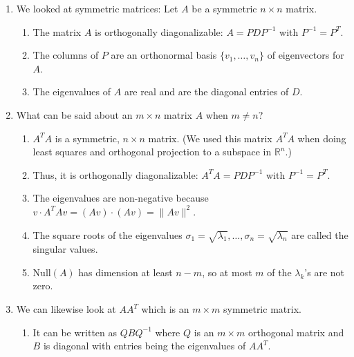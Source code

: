 \begin{enumerate}
    \setlength{\itemsep}{5em}

    \item We looked at symmetric matrices: Let $A$ be a symmetric $n \times n$ matrix.
    \begin{enumerate}    \setlength{\itemsep}{3em}

        \item The matrix $A$ is orthogonally diagonalizable: $A = P D P^{-1}$ with $P^{-1} = P^T$.
        \item The columns of $P$ are an orthonormal basis $\{v_1, \dots, v_n\}$ of eigenvectors for $A$.
        \item The eigenvalues of $A$ are real and are the diagonal entries of $D$.
    \end{enumerate}

    \item What can be said about an $m \times n$ matrix $A$ when $m \neq n$?
    \begin{enumerate}    \setlength{\itemsep}{3em}

        \item $A^T A$ is a symmetric, $n \times n$ matrix. (We used this matrix $A^T A$ when doing least squares and orthogonal projection to a subspace in $\mathbb{R}^n$.)
        \item Thus, it is orthogonally diagonalizable: $A^T A = P D P^{-1}$ with $P^{-1} = P^T$.
        \item The eigenvalues are non-negative because $v \cdot A^T A v = (A v) \cdot (A v) = \|A v\|^2$.
        \item The square roots of the eigenvalues $\sigma_1 = \sqrt{\lambda_1}, \dots, \sigma_n = \sqrt{\lambda_n}$ are called the singular values.
        \item $\text{Null}(A)$ has dimension at least $n - m$, so at most $m$ of the $\lambda_k$'s are not zero.
    \end{enumerate}

\newpage

    \item We can likewise look at $A A^T$ which is an $m \times m$ symmetric matrix.
    \begin{enumerate}    \setlength{\itemsep}{5em}

        \item It can be written as $Q B Q^{-1}$ where $Q$ is an $m \times m$ orthogonal matrix and $B$ is diagonal with entries being the eigenvalues of $A A^T$.
    \end{enumerate}


\end{enumerate}
